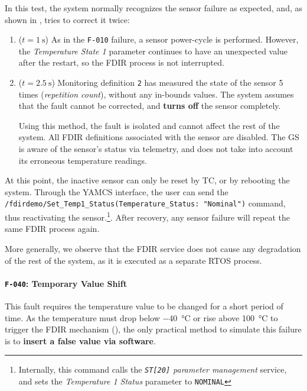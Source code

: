\documentclass[a4paper,nobib]{tufte-book}
\begin{document}
In this test, the system normally recognizes the sensor failure as expected, and, as shown in , tries to correct it twice:
\begin{enumerate}
	\item (\( t = \SI{1}{\second}\)) As in the \texttt{F-010} failure, a sensor power-cycle is performed. However, the \emph{Temperature State 1} parameter continues to have an unexpected value after the restart, so the \acs{FDIR} process is not interrupted.
\item (\(t = \SI{2.5}{\second}\)) Monitoring definition \texttt{2} has measured the state of the sensor 5 times (\emph{repetition count}), without any in-bounds values. The system assumes that the fault cannot be corrected, and \textbf{turns off} the sensor completely.

Using this method, the fault is isolated and cannot affect the rest of the system. All \acs{FDIR} definitions associated with the sensor are disabled. The \acl{GS} is aware of the sensor's status via telemetry, and does not take into account its erroneous temperature readings.
\end{enumerate}

At this point, the inactive sensor can only be reset by \acs{TC}, or by rebooting the system. Through the \acs{YAMCS} interface, the user can send the \texttt{/fdirdemo/Set_Temp1_Status(Temperature_Status: "Nominal")} command, thus reactivating the sensor.\footnote[][2ex]{Internally, this command calls the \emph{\texttt{ST[20]} parameter management} service, and sets the \emph{Temperature 1 Status} parameter to \texttt{NOMINAL}}. After recovery, any sensor failure will repeat the same \acs{FDIR} process again.

More generally, we observe that the \acs{FDIR} service does not cause any degradation of the rest of the system, as it is executed as a separate \acs{RTOS} process.

\clearpage
\paragraph{\textbf{\texttt{F-040}: Temporary Value Shift}}\hspace{0pt}

This fault requires the temperature value to be changed for a short period of time. As the temperature must drop below \SI{-40}{\celsius} or rise above \SI{100}{\celsius} to trigger the \acs{FDIR} mechanism (), the only practical method to simulate this failure is to \textbf{insert a false value via software}.
\end{document}
